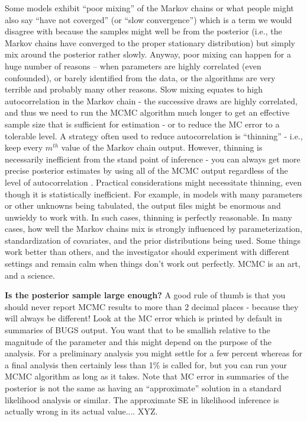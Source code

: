 Some models exhibit ``poor mixing'' of the Markov chains or what
people might also say ``have not coverged'' (or ``slow convergence'')
which is a term we would disagree with because the samples might well
be from the posterior (i.e., the Markov chains have converged to the
proper stationary distribution) but simply mix around the posterior
rather slowly. Anyway, poor mixing can happen for a huge number of
reasons -- when parameters are highly correlated (even confounded), or
barely identified from the data, or the algorithms are very terrible
and probably many other reasons.  Slow mixing equates to high
autocorrelation in the Markov chain - the successive draws are highly
correlated, and thus we need to run the MCMC algorithm much longer to
get an effective sample size that is sufficient for estimation - or to
reduce the MC error to a tolerable level.  A strategy often used to
reduce autocorrelation is ``thinning'' - i.e., keep every $m^{th}$
value of the Markov chain output. However, thinning is necessarily
inefficient from the stand point of inference - you can always get
more precise posterior estimates by using all of the MCMC output
regardless of the level of autocorrelation
\citep{maceachern_berliner:1994}. Practical considerations might
necessitate thinning, even though it is statistically inefficient. For
example, in models with many parameters or other unknowns being
tabulated, the output files might be enormous and unwieldy to work
with. In such cases, thinning is perfectly reasonable. In many cases,
how well the Markov chains mix is strongly influenced by
parameterization, standardization of covariates, and the prior
distributions being used. Some things work better than others, and the
investigator should experiment with different settings and 
remain calm when things don't work out perfectly. MCMC is an
art, and a science.


{\bf Is the posterior sample large enough?}  A good rule
of thumb is that you should never report
MCMC results to more than 2 decimal places - because they will always
be different! Look at the MC error which is printed by default in
summaries of BUGS output.  You want that to be smallish relative to the
magnitude of the parameter and this might depend on the purpose of the
analysis. For a preliminary analysis you might settle for a few
percent whereas for a final analysis then certainly less than 1\% is
called for, but you can run 
your MCMC
algorithm as long as it takes. Note that MC error in summaries of the
posterior is not the same as having an ``approximate'' solution in a
standard likelihood analysis or similar.  The approximate SE in
likelihood inference is actually wrong in its actual value.... XYZ.



